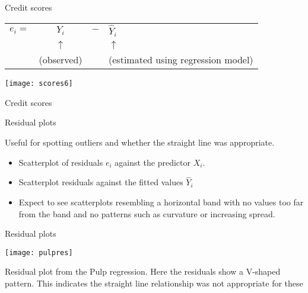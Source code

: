 \documentclass[14pt]{beamer}
\makeatletter
\def\biz{\begin{itemize}[<+-| alert@+>]}
\def\eiz{\end{itemize}}
\makeatother
\begin{document}
\begin{frame}{Credit scores}\vspace*{-0.2cm}

\begin{tabular}{lccl}
$e_i =$ & $Y_i$ & \hspace*{-0.8cm}$-$ & $\hat Y_i$ \\
& $\uparrow$ & & $\uparrow$ \\
& \hspace*{-0.8cm}(observed) & & \hspace*{-0.4cm}(estimated using regression model)
\end{tabular}

\pause

\centerline{\texttt{[image: scores6]}}

\end{frame}

\begin{frame}{Credit scores}
\end{frame}


\begin{frame}{Residual plots}

Useful for spotting outliers and whether the straight line was
appropriate.

\biz
\item Scatterplot of residuals $e_i$ against the predictor
$X_i$.

\item Scatterplot residuals against the fitted values $\hat Y_i$

\item Expect to see scatterplots resembling a horizontal band with
no values too far from the band and no patterns such as curvature or
increasing spread.
\eiz

\end{frame}

\begin{frame}{Residual plots}\small\vspace*{-0.4cm}

\centerline{\texttt{[image: pulpres]}}

{Residual plot from the Pulp regression.  Here the residuals show a
V-shaped pattern. This indicates the straight line relationship was
not appropriate for these }

\end{frame}
\end{document}
